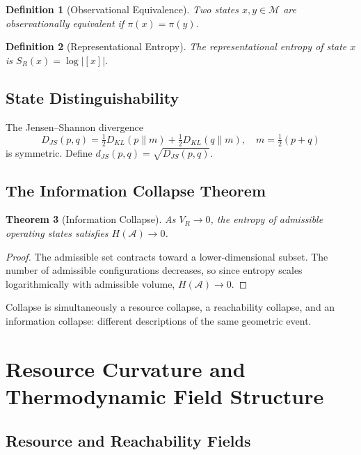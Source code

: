 \documentclass[12pt,a4paper]{article}
\newtheorem{theorem}{Theorem}[section]
\newtheorem{definition}[theorem]{Definition}
\newcommand{\A}{\mathcal{A}}
\newcommand{\M}{\mathcal{M}}
\begin{document}
\begin{definition}[Observational Equivalence]
Two states $x, y \in \M$ are \emph{observationally equivalent} if $\pi(x) = \pi(y)$.
\end{definition}

\begin{definition}[Representational Entropy]
The \emph{representational entropy} of state $x$ is $S_R(x) = \log |[x]|$.
\end{definition}

\subsection{State Distinguishability}

The Jensen--Shannon divergence
\[
D_{JS}(p,q) = \tfrac{1}{2} D_{KL}(p \| m) + \tfrac{1}{2} D_{KL}(q \| m), \quad m = \tfrac{1}{2}(p+q)
\]
is symmetric. Define $d_{JS}(p,q) = \sqrt{D_{JS}(p,q)}$.

\subsection{The Information Collapse Theorem}

\begin{theorem}[Information Collapse]
As $V_R \to 0$, the entropy of admissible operating states satisfies $H(\A) \to 0$.
\end{theorem}

\begin{proof}
The admissible set contracts toward a lower-dimensional subset. The number of admissible configurations decreases, so since entropy scales logarithmically with admissible volume, $H(\A) \to 0$.
\end{proof}

Collapse is simultaneously a resource collapse, a reachability collapse, and an information collapse: different descriptions of the same geometric event.

\section{Resource Curvature and Thermodynamic Field Structure}

\subsection{Resource and Reachability Fields}
\end{document}
